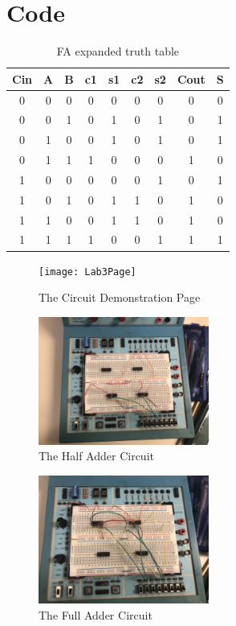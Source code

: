 \documentclass[11pt]{article}
\begin{document}
\section*{Code}

    \begin{table}[ht]\centering
		\caption{FA expanded truth table}
		\label{tbl:FA expanded truth table}
		\begin{tabular}{ccc|cccc|cc}
			\toprule
			Cin & A & B & c1 & s1 & c2 & s2 & Cout & S \\
			\midrule
			0 & 0 & 0 & 0 & 0 & 0 & 0 & 0 & 0 \\
			0 & 0 & 1 & 0 & 1 & 0 & 1 & 0 & 1 \\
			0 & 1 & 0 & 0 & 1 & 0 & 1 & 0 & 1 \\
			0 & 1 & 1 & 1 & 0 & 0 & 0 & 1 & 0 \\
			1 & 0 & 0 & 0 & 0 & 0 & 1 & 0 & 1 \\
			1 & 0 & 1 & 0 & 1 & 1 & 0 & 1 & 0 \\
			1 & 1 & 0 & 0 & 1 & 1 & 0 & 1 & 0 \\
			1 & 1 & 1 & 1 & 0 & 0 & 1 & 1 & 1 \\
			\bottomrule
		\end{tabular}
	\end{table}
	
	\begin{figure}[ht]\centering
		\texttt{[image: Lab3Page]}
		\caption{The Circuit Demonstration Page}
		\label{fig:Lab3Page}
	\end{figure}
	
	\begin{figure}[ht]\centering
		\includegraphics[width=0.5\textwidth]{HalfAdder}
		\caption{The Half Adder Circuit}
		\label{fig:HalfAdder}
	\end{figure}
	
	\begin{figure}[ht]\centering
		\includegraphics[width=0.5\textwidth]{FullAdder}
		\caption{The Full Adder Circuit}
		\label{fig:FullAdder}
	\end{figure}
	
\end{document}
